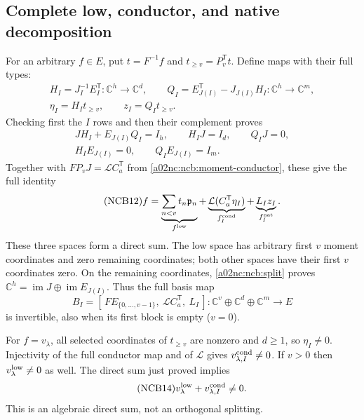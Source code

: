 \documentclass[11pt,a4paper]{article}
\begin{document}
\subsection{Complete low, conductor, and native decomposition}
For an arbitrary $f\in E$, put $t=F^{-1}f$ and
$t_{\geq v}=P_v^{\mathsf T}t$. Define maps with their full types:
\begin{equation}\tag{NCB10}\label{a02nc:ncb:HQ}
\begin{gathered}
H_I=J_I^{-1}E_I^{\mathsf T}:\mathbb C^h\to\mathbb C^d,\qquad
Q_I=E_{J(I)}^{\mathsf T}-J_{J(I)}H_I:
       \mathbb C^h\to\mathbb C^m,\\
\eta_I=H_It_{\geq v},\qquad z_I=Q_It_{\geq v}.
\end{gathered}
\end{equation}
Checking first the $I$ rows and then their complement proves
\begin{equation}\tag{NCB11}\label{a02nc:ncb:split}
\begin{gathered}
JH_I+E_{J(I)}Q_I=I_h,\qquad H_IJ=I_d,\qquad Q_IJ=0,\\
H_IE_{J(I)}=0,\qquad Q_IE_{J(I)}=I_m.
\end{gathered}
\end{equation}
Together with $FP_vJ=\mathcal LC_a^{\mathsf T}$ from
\eqref{a02nc:ncb:moment-conductor}, these give the full identity
\begin{equation}\tag{NCB12}\label{a02nc:ncb:decomposition}
f=\underbrace{\sum_{n<v}t_n\mathfrak p_n}_{f^{\rm low}}
 +\underbrace{\mathcal L(C_a^{\mathsf T}\eta_I)}_{f_I^{\rm cond}}
 +\underbrace{L_Iz_I}_{f_I^{\rm nat}} .
\end{equation}
These three spaces form a direct sum. The low space has arbitrary
first $v$ moment coordinates and zero remaining coordinates; both
other spaces have their first $v$ coordinates zero. On the remaining
coordinates, \eqref{a02nc:ncb:split} proves
$\mathbb C^h=\operatorname{im}J\oplus\operatorname{im}E_{J(I)}$.
Thus the full basis map
\begin{equation}\tag{NCB13}\label{a02nc:ncb:full-chart}
B_I=[\,FE_{\{0,\ldots,v-1\}},\ \mathcal LC_a^{\mathsf T},\ L_I\,]:
\mathbb C^v\oplus\mathbb C^d\oplus\mathbb C^m\longrightarrow E
\end{equation}
is invertible, also when its first block is empty ($v=0$).

For $f=v_\lambda$, all selected coordinates of $t_{\geq v}$ are
nonzero and $d\geq1$, so $\eta_I\ne0$. Injectivity of the full
conductor map and of $\mathcal L$ gives
$v_{\lambda,I}^{\rm cond}\ne0$. If $v>0$ then
$v_\lambda^{\rm low}\ne0$ as well. The direct sum just proved implies
\begin{equation}\tag{NCB14}\label{a02nc:ncb:nonzero}
v_\lambda^{\rm low}+v_{\lambda,I}^{\rm cond}\ne0 .
\end{equation}
This is an algebraic direct sum, not an orthogonal splitting.
\end{document}
